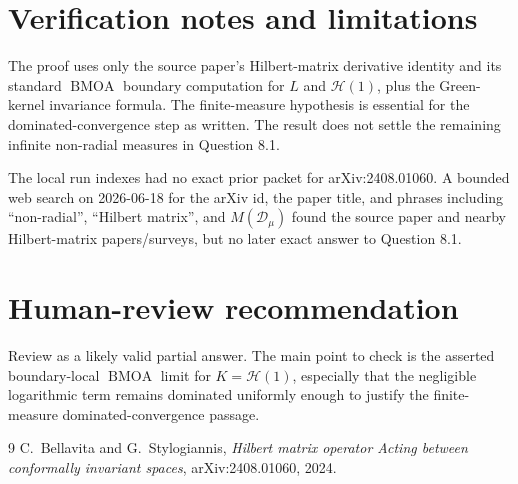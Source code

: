 \documentclass[11pt]{article}
\newcommand{\HH}{\mathcal H}
\newcommand{\BMOA}{\operatorname{BMOA}}
\begin{document}
\section*{Verification notes and limitations}

The proof uses only the source paper's Hilbert-matrix derivative identity and
its standard \(\BMOA\) boundary computation for \(L\) and \(\HH(1)\), plus the
Green-kernel invariance formula.  The finite-measure hypothesis is essential
for the dominated-convergence step as written.  The result does not settle the
remaining infinite non-radial measures in Question 8.1.

The local run indexes had no exact prior packet for arXiv:2408.01060.  A
bounded web search on 2026-06-18 for the arXiv id, the paper title, and phrases
including ``non-radial'', ``Hilbert matrix'', and \(M(\mathcal D_\mu)\) found
the source paper and nearby Hilbert-matrix papers/surveys, but no later exact
answer to Question 8.1.

\section*{Human-review recommendation}

Review as a likely valid partial answer.  The main point to check is the
asserted boundary-local \(\BMOA\) limit for \(K=\HH(1)\), especially that the
negligible logarithmic term remains dominated uniformly enough to justify the
finite-measure dominated-convergence passage.

\begin{thebibliography}{9}
C.~Bellavita and G.~Stylogiannis,
\emph{Hilbert matrix operator Acting between conformally invariant spaces},
arXiv:2408.01060, 2024.
\end{thebibliography}
\end{document}
